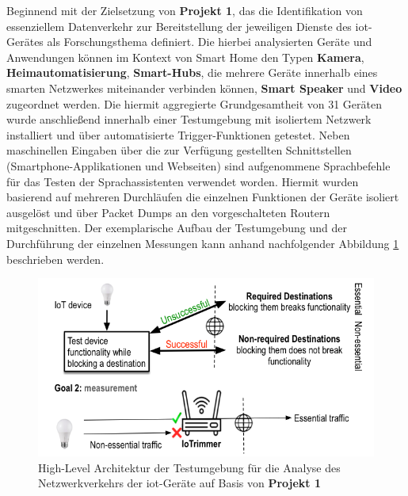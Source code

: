 \noindent Beginnend mit der Zielsetzung von \textbf{Projekt 1}, das die Identifikation von essenziellem Datenverkehr zur Bereitstellung der jeweiligen Dienste des \ac{iot}-Gerätes als Forschungsthema definiert. Die hierbei analysierten Geräte und Anwendungen können im Kontext von Smart Home den Typen \textbf{Kamera}, \textbf{Heimautomatisierung}, \textbf{Smart-Hubs}, die mehrere Geräte innerhalb eines smarten Netzwerkes miteinander verbinden können, \textbf{Smart Speaker} und \textbf{Video} zugeordnet werden. 
Die hiermit aggregierte Grundgesamtheit von 31 Geräten wurde anschließend innerhalb einer Testumgebung mit isoliertem Netzwerk installiert und über automatisierte Trigger-Funktionen getestet. 
Neben maschinellen Eingaben über die zur Verfügung gestellten Schnittstellen (Smartphone-Applikationen und Webseiten) sind aufgenommene Sprachbefehle für das Testen der Sprachassistenten verwendet worden. Hiermit wurden basierend auf mehreren Durchläufen die einzelnen Funktionen der Geräte isoliert ausgelöst und über Packet Dumps an den vorgeschalteten Routern mitgeschnitten.
Der exemplarische Aufbau der Testumgebung und der Durchführung der einzelnen Messungen kann anhand nachfolgender Abbildung \ref{fig:test-setup-proj1} beschrieben werden.

\begin{figure}
    \centering
    \includegraphics[scale=0.35]{main/countermeasures/pictures/IoTrimmer_IoTrigger}
    \caption{High-Level Architektur der Testumgebung für die Analyse des Netzwerkverkehrs der \ac{iot}-Geräte auf Basis von \textbf{Projekt 1} \cite{Mandalari2021}}
    \label{fig:test-setup-proj1}
\end{figure}

